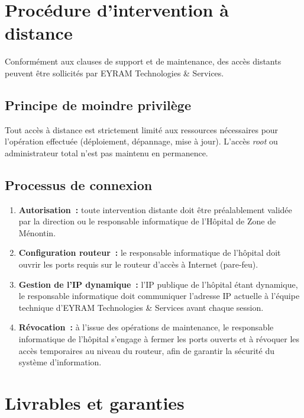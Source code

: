\documentclass[11pt,a4paper]{article}
\begin{document}
\section{Procédure d'intervention à distance}

Conformément aux clauses de support et de maintenance, des accès distants peuvent être sollicités par EYRAM Technologies \& Services.

\subsection{Principe de moindre privilège}
Tout accès à distance est strictement limité aux ressources nécessaires pour l'opération effectuée (déploiement, dépannage, mise à jour). L'accès \emph{root} ou administrateur total n'est pas maintenu en permanence.

\subsection{Processus de connexion}
\begin{enumerate}
  \item \textbf{Autorisation~:} toute intervention distante doit être préalablement validée par la direction ou le responsable informatique de l'Hôpital de Zone de Ménontin.
  \item \textbf{Configuration routeur~:} le responsable informatique de l'hôpital doit ouvrir les ports requis sur le routeur d'accès à Internet (pare-feu).
  \item \textbf{Gestion de l'IP dynamique~:} l'IP publique de l'hôpital étant dynamique, le responsable informatique doit communiquer l'adresse IP actuelle à l'équipe technique d'EYRAM Technologies \& Services avant chaque session.
  \item \textbf{Révocation~:} à l'issue des opérations de maintenance, le responsable informatique de l'hôpital s'engage à fermer les ports ouverts et à révoquer les accès temporaires au niveau du routeur, afin de garantir la sécurité du système d'information.
\end{enumerate}

\section{Livrables et garanties}
\end{document}
